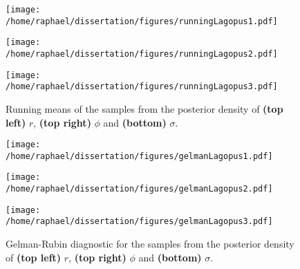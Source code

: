 \documentclass[12pt]{article}
\begin{document}
	\begin{figure}[htb]
		\centering
		\begin{minipage}{0.4\textwidth}
			\centering
			\texttt{[image: /home/raphael/dissertation/figures/runningLagopus1.pdf]}
		\end{minipage}
		\begin{minipage}{0.4\textwidth}
			\centering
			\texttt{[image: /home/raphael/dissertation/figures/runningLagopus2.pdf]}
		\end{minipage}
		\begin{minipage}{0.4\textwidth}
			\centering
			\texttt{[image: /home/raphael/dissertation/figures/runningLagopus3.pdf]}
		\end{minipage}
		\caption{Running means of the samples from the posterior density of \textbf{(top left)} $r$, \textbf{(top right)} $\phi$ and \textbf{(bottom)} $\sigma$.}
		\label{fig:rmLagopus}
	\end{figure}
	
	\clearpage
	\begin{figure}[htb]
		\centering
		\begin{minipage}{0.4\textwidth}
			\centering
			\texttt{[image: /home/raphael/dissertation/figures/gelmanLagopus1.pdf]}
		\end{minipage}
		\begin{minipage}{0.4\textwidth}
			\centering
			\texttt{[image: /home/raphael/dissertation/figures/gelmanLagopus2.pdf]}
		\end{minipage}
		\begin{minipage}{0.4\textwidth}
			\centering
			\texttt{[image: /home/raphael/dissertation/figures/gelmanLagopus3.pdf]}
		\end{minipage}
		\caption{Gelman-Rubin diagnostic for the samples from the posterior density of \textbf{(top left)} $r$, \textbf{(top right)} $\phi$ and \textbf{(bottom)} $\sigma$.}
		\label{fig:gelmanLagopus}
	\end{figure}
	
\end{document}
